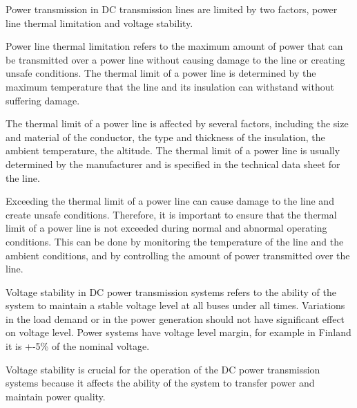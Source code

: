 Power transmission in DC transmission lines are limited by two factors, power line thermal limitation and voltage stability.

Power line thermal limitation refers to the maximum amount of power that can be transmitted over a power line without causing damage to the line or creating unsafe conditions. The thermal limit of a power line is determined by the maximum temperature that the line and its insulation can withstand without suffering damage.

The thermal limit of a power line is affected by several factors, including the size and material of the conductor, the type and thickness of the insulation, the ambient temperature, the altitude. The thermal limit of a power line is usually determined by the manufacturer and is specified in the technical data sheet for the line.

Exceeding the thermal limit of a power line can cause damage to the line and create unsafe conditions. Therefore, it is important to ensure that the thermal limit of a power line is not exceeded during normal and abnormal operating conditions. This can be done by monitoring the temperature of the line and the ambient conditions, and by controlling the amount of power transmitted over the line.

Voltage stability in DC power transmission systems refers to the ability of the system to maintain a stable voltage level at all buses under all times.  Variations in the load demand or in the power generation should not have significant effect on voltage level. Power systems have voltage level margin, for example in Finland it is +-5\% of the nominal voltage.

Voltage stability is crucial for the operation of the DC power transmission systems because it affects the ability of the system to transfer power and maintain power quality.







\begin{comment}

potential sources
[1] J. Grainger and W. Stevenson, Power System Analysis, McGraw-Hill, 1994.
[2] T.A. Short, Power System Stability and Control, IEEE Press, 1993.
[3] J.K. Saini and P. Kundur, Power System Stability and Control, CRC Press, 2007.
[4] R. Lasseter and G. Andhankar, "Microgrids and Active Distribution Networks," IEEE Power and Energy Magazine, vol. 11, no. 3, pp. 40-50, 2013.
\end{comment}